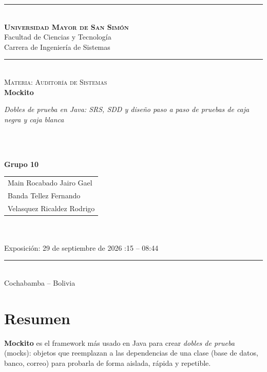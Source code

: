 \documentclass[11pt,a4paper,oneside]{report}
\newcommand{\universidad}{Universidad Mayor de San Simón}
\newcommand{\facultad}{Facultad de Ciencias y Tecnología}
\newcommand{\carrera}{Carrera de Ingeniería de Sistemas}
\newcommand{\materia}{Auditoría de Sistemas}
\newcommand{\docente}{} %
\newcommand{\tema}{Mockito}
\newcommand{\subtema}{Dobles de prueba en Java: SRS, SDD y diseño paso a paso de pruebas de caja negra y caja blanca}
\newcommand{\grupo}{Grupo 10}
\newcommand{\fechaexpo}{29 de septiembre de 2026 \quad 08:15 -- 08:44}
\begin{document}
\begin{titlepage}
  \centering
  {\color{primario}\rule{\linewidth}{2pt}}\\[0.6cm]
  {\LARGE\bfseries\scshape \universidad}\\[0.2cm]
  {\large \facultad}\\[0.1cm]
  {\large \carrera}\\[0.6cm]
  {\color{primario}\rule{\linewidth}{0.6pt}}\\[1.8cm]

  {\large\scshape Materia: \materia}\\[1.2cm]
  {\fontsize{46}{50}\selectfont\bfseries\color{primario} \tema}\\[0.5cm]
  \begin{minipage}{0.8\linewidth}\centering\large\itshape \subtema\end{minipage}\\[1.6cm]

  \\[1.8cm]

  {\large\bfseries \grupo}\\[0.4cm]
  \begin{tabular}{l}
    Main Rocabado Jairo Gael \\
    Banda Tellez Fernando \\
    Velasquez Ricaldez Rodrigo
  \end{tabular}\\[0.8cm]
  \ifx\docente\empty\else{\large Docente: \docente}\\[0.4cm]\fi
  {\small Exposición: \fechaexpo}\\
  \vfill
  {\color{primario}\rule{\linewidth}{0.6pt}}\\[0.2cm]
  {\large Cochabamba -- Bolivia }
\end{titlepage}

\chapter*{Resumen}
\textbf{Mockito} es el framework más usado en Java para crear \emph{dobles de prueba} (mocks): objetos que reemplazan a las dependencias de una clase (base de datos, banco, correo) para probarla de forma aislada, rápida y repetible.
\end{document}
